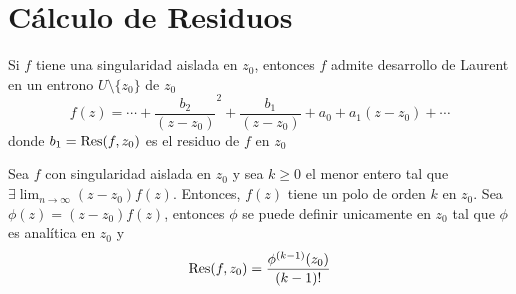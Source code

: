 \section{Cálculo de Residuos}

\begin{note}
  Si $f$ tiene una singularidad aislada en $z_{0}$, entonces $f$ admite desarrollo de Laurent en un entrono $U \setminus \{ z_{0} \}$ de $z_{0}$
  \[ 
    f(z) = \cdots + \frac{b_{2}}{(z - z_{0})}^{2} + \frac{b_{1}}{(z - z_{0})} + a_{0} + a_{1}(z - z_{0}) + \cdots 
  \] 
  donde $b_{1} = \operatorname{Res} (f, z_{0})$ es el residuo de $f$ en $z_{0}$
\end{note}

\begin{prop}
  Sea $f$ con singularidad aislada en $z_{0}$ y sea $k \geq 0$ el menor entero tal que $\exists \lim_{n \to \infty} (z - z_{0}) f(z)$. Entonces, $f(z)$ tiene un polo de orden $k$ en $z_{0}$. Sea $\phi(z) = (z - z_{0}) f(z)$, entonces $\phi$ se puede definir unicamente en $z_{0}$ tal que $\phi$ es analítica en $z_{0}$ y
  \[ 
    \operatorname{Res}(f, z_{0}) = \frac{\phi^{(k-1)}(z_{0})}{(k-1)!} 
  \] 
\end{prop}
